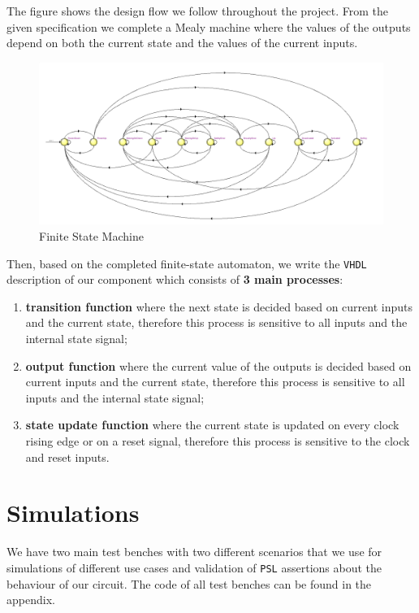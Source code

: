\documentclass[a4paper,11pt]{article}
\begin{document}
    \par The figure shows the design flow we follow throughout the project. From the given specification we complete a Mealy machine where the values of the outputs depend on both the current state and the values of the current inputs.
    
    \begin{figure}[H]
      \centering
      \includegraphics[width=1\linewidth]{PROJECT0_2.png}  
      \caption{Finite State Machine}
    \end{figure}
    
    \par Then, based on the completed finite-state automaton, we write the \texttt{VHDL} description of our component which consists of \textbf{3 main processes}:
    \begin{enumerate}
        \item \textbf{transition function} where the next state is decided based on current inputs and the current state, therefore this process is sensitive to all inputs and the internal state signal;
        \item \textbf{output function} where the current value of the outputs is decided based on current inputs and the current state, therefore this process is sensitive to all inputs and the internal state signal;
        \item \textbf{state update function} where the current state is updated on every clock rising edge or on a reset signal, therefore this process is sensitive to the clock and reset inputs.
    \end{enumerate}
    
	\section{Simulations}
	
	We have two main test benches with two different scenarios that we use for simulations of different use cases and validation of \texttt{PSL} assertions about the behaviour of our circuit. The code of all test benches can be found in the appendix.
	
\end{document}
